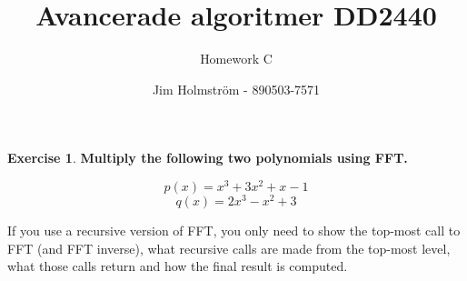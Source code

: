\documentclass[a4paper,twoside=false,abstract=false,numbers=noenddot,
titlepage=false,headings=small,parskip=half,version=last]{scrartcl}
\author{Jim Holmström - 890503-7571}
\title{Avancerade algoritmer DD2440}
\subtitle{Homework C}
\theoremstyle{definition}
\newtheorem{exercise}{Exercise}
\theoremstyle{remark}
\begin{document}
\maketitle
\thispagestyle{empty}

\begin{exercise}
{\bf
Multiply the following two polynomials using FFT.

\begin{equation*}
p(x)=x^3+3x^2+x-1
\end{equation*}
\begin{equation*}
q(x)=2x^3-x^2+3
\end{equation*}

If you use a recursive version of FFT, you only need
to show the top-most call to FFT (and FFT inverse),
what recursive calls are made from the top-most level,
what those calls return and how the final result is computed.
}
\end{exercise}
\end{document}
